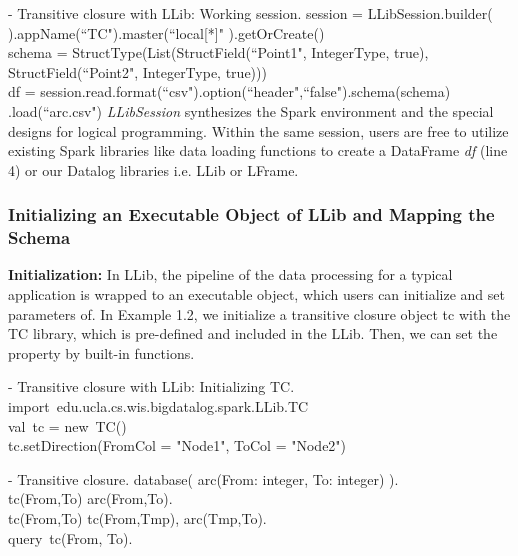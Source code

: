 \vspace{0.5em}
 - Transitive closure with LLib:  Working session.
\bldl
session = LLibSession.builder(
).appName(``TC").master(``local[*]"
).getOrCreate()\\

schema = StructType(List(StructField(``Point1", IntegerType, true),\\
StructField(``Point2", IntegerType, true)))\\

df = session.read.format(``csv").option(``header",``false").schema(schema)
.load(``arc.csv")
\eldl
\textit{LLibSession} synthesizes the  Spark environment and the special designs for logical programming. Within the same session, users are free to utilize existing Spark libraries like data loading functions to create a DataFrame \textit{df} (line 4)  or our Datalog libraries i.e. LLib or LFrame. 

\subsubsection{Initializing an Executable Object of LLib and  Mapping the Schema}

\textbf{Initialization: }In LLib, the pipeline of the data processing for a typical application is wrapped to an executable object, which users can initialize and set parameters of. In Example 1.2, we initialize a transitive closure object tc with the TC library, which is pre-defined and included in the LLib. 
Then, we can set the property by built-in functions. 


\vspace{0.5em}
 - Transitive closure with LLib:  Initializing TC.
\cldl
import\ edu.ucla.cs.wis.bigdatalog.spark.LLib.TC \\
val\ tc = new\ TC() \\

tc.setDirection(FromCol = "Node1", ToCol = "Node2")
\eldl

\vspace{0.5em}
 - Transitive closure.
\bldl
database({
	arc(From: integer, To: integer)
}).\\


tc(From,To) \leftarrow arc(From,To).\\
tc(From,To) \leftarrow tc(From,Tmp), arc(Tmp,To). \\
query\ tc(From, To).
\eldl

